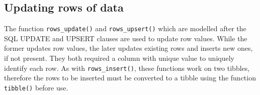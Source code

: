 \documentclass[
]{book}
\begin{document}
\hypertarget{updating-rows-of-data-1}{%
\subsection{Updating rows of data}\label{updating-rows-of-data-1}}

The function \texttt{rows\_update()} and \texttt{rows\_upsert()} which are modelled after the SQL UPDATE and UPSERT clauses are used to update row values. While the former updates row values, the later updates existing rows and inserts new ones, if not present. They both required a column with unique value to uniquely identify each row. As with \texttt{rows\_insert()}, these functions work on two tibbles, therefore the rows to be inserted must be converted to a tibble using the function \texttt{tibble()} before use.
\end{document}
